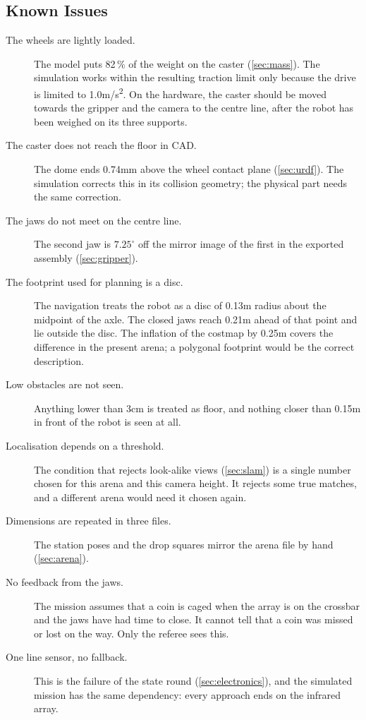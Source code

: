 \subsection{Known Issues}
\label{sec:issues}
\begin{description}
  \item[The wheels are lightly loaded.] The model puts 82\,\% of the weight on the caster
        (\cref{sec:mass}). The simulation works within the resulting traction limit only
        because the drive is limited to 1.0\unit{m/s^2}. On the hardware, the caster should
        be moved towards the gripper and the camera to the centre line, after the robot has
        been weighed on its three supports.
  \item[The caster does not reach the floor in CAD.] The dome ends 0.74\unit{mm} above the
        wheel contact plane (\cref{sec:urdf}). The simulation corrects this in its collision
        geometry; the physical part needs the same correction.
  \item[The jaws do not meet on the centre line.] The second jaw is $7.25^\circ$ off the
        mirror image of the first in the exported assembly (\cref{sec:gripper}).
  \item[The footprint used for planning is a disc.] The navigation treats the robot as a
        disc of 0.13\unit{m} radius about the midpoint of the axle. The closed jaws reach
        0.21\unit{m} ahead of that point and lie outside the disc. The inflation of the
        costmap by 0.25\unit{m} covers the difference in the present arena; a polygonal
        footprint would be the correct description.
  \item[Low obstacles are not seen.] Anything lower than 3\unit{cm} is treated as floor, and
        nothing closer than 0.15\unit{m} in front of the robot is seen at all.
  \item[Localisation depends on a threshold.] The condition that rejects look-alike views
        (\cref{sec:slam}) is a single number chosen for this arena and this camera height.
        It rejects some true matches, and a different arena would need it chosen again.
  \item[Dimensions are repeated in three files.] The station poses and the drop squares
        mirror the arena file by hand (\cref{sec:arena}).
  \item[No feedback from the jaws.] The mission assumes that a coin is caged when the array
        is on the crossbar and the jaws have had time to close. It cannot tell that a coin
        was missed or lost on the way. Only the referee sees this.
  \item[One line sensor, no fallback.] This is the failure of the state round
        (\cref{sec:electronics}), and the simulated mission has the same dependency: every
        approach ends on the infrared array.
\end{description}

